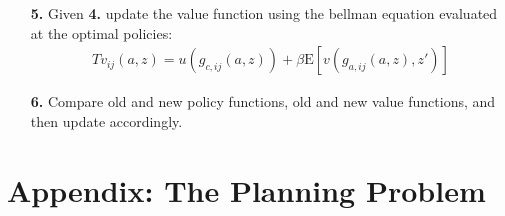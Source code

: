 \documentclass[12pt,pdftex]{article}
\begin{document}
\begin{onehalfspacing}
\begin{itemize}
\item[\textbf{5.}] Given \textbf{4.} update the value function using the bellman equation evaluated at the optimal policies:
\begin{align}
Tv_{ij}(a, z) = u(g_{c,ij}(a,z)) + \beta \mathrm{E}\left[ v(g_{a,ij}(a,z), z') \right]
\end{align}

\item[\textbf{6.}] Compare old and new policy functions, old and new value functions, and then update accordingly.


%
\end{itemize}

\section{Appendix: The Planning Problem}


\end{onehalfspacing}
\end{document}
